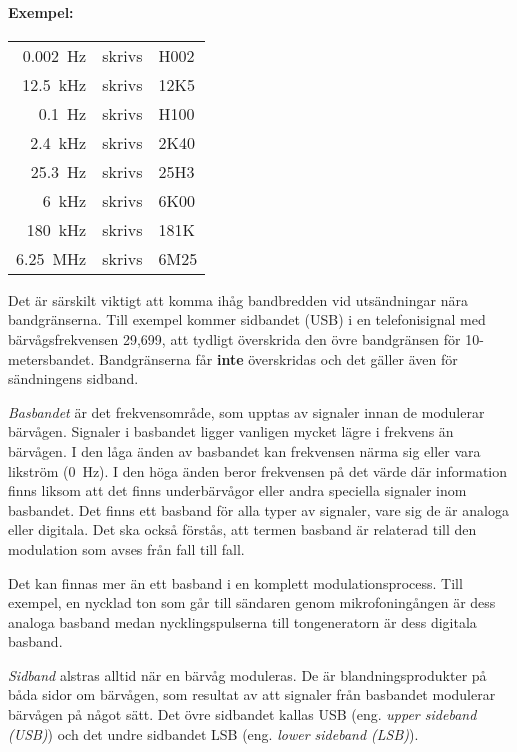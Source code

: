 \paragraph{Exempel:}

\begin{center}
\begin{tabular}{rll}
	\qty{0,002}{\hertz}     & skrivs & H002 \\
	\qty{12,5}{\kilo\hertz} & skrivs & 12K5 \\
	\qty{0,1}{\hertz}       & skrivs & H100 \\
	\qty{2,4}{\kilo\hertz}  & skrivs & 2K40 \\
	\qty{25,3}{\hertz}      & skrivs & 25H3 \\
	\qty{6}{\kilo\hertz}    & skrivs & 6K00 \\
	\qty{180}{\kilo\hertz}  & skrivs & 181K \\
	\qty{6,25}{\mega\hertz} & skrivs & 6M25 \\
\end{tabular}
\end{center}

Det är särskilt viktigt att komma ihåg bandbredden vid utsändningar nära
bandgränserna.
Till exempel kommer sidbandet (USB) i en telefonisignal med bärvågsfrekvensen 29,699,
att tydligt överskrida den övre bandgränsen för 10-metersbandet.
Bandgränserna får \textbf{inte} överskridas och det gäller även för sändningens
sidband.

\emph{Basbandet} är det frekvensområde, som upptas av signaler innan de
modulerar bärvågen.
Signaler i basbandet ligger vanligen mycket lägre i frekvens än bärvågen.
I den låga änden av basbandet kan frekvensen närma sig eller vara likström
(\qty{0}{\hertz}).
I den höga änden beror frekvensen på det värde där information finns liksom att
det finns underbärvågor eller andra speciella signaler inom basbandet.
Det finns ett basband för alla typer av signaler, vare sig de är analoga eller
digitala.
Det ska också förstås, att termen basband är relaterad till den modulation som
avses från fall till fall.

Det kan finnas mer än ett basband i en komplett modulationsprocess.
Till exempel, en nycklad ton som går till sändaren genom mikrofoningången är
dess analoga basband medan nycklingspulserna till tongeneratorn är dess digitala
basband.

\emph{Sidband} alstras alltid när en bärvåg moduleras.
De är blandningsprodukter på båda sidor om bärvågen, som resultat av att
signaler från basbandet modulerar bärvågen på något sätt.
Det övre sidbandet kallas USB (eng. \emph{upper sideband (USB)})
och det undre sidbandet LSB (eng. \emph{lower sideband (LSB)}).


